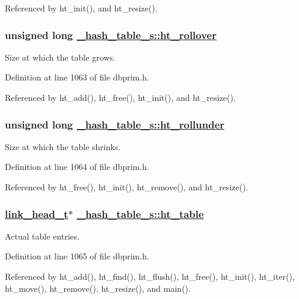 Referenced by ht\_\-init(), and ht\_\-resize().\hypertarget{struct__hash__table__s_o4}{
\subsubsection[ht\_\-rollover]{\setlength{\rightskip}{0pt plus 5cm}unsigned long \hyperlink{struct__hash__table__s_o4}{\_\-hash\_\-table\_\-s::ht\_\-rollover}}}
\label{struct__hash__table__s_o4}


Size at which the table grows. 

Definition at line 1063 of file dbprim.h.

Referenced by ht\_\-add(), ht\_\-free(), ht\_\-init(), and ht\_\-resize().\hypertarget{struct__hash__table__s_o5}{
\subsubsection[ht\_\-rollunder]{\setlength{\rightskip}{0pt plus 5cm}unsigned long \hyperlink{struct__hash__table__s_o5}{\_\-hash\_\-table\_\-s::ht\_\-rollunder}}}
\label{struct__hash__table__s_o5}


Size at which the table shrinks. 

Definition at line 1064 of file dbprim.h.

Referenced by ht\_\-free(), ht\_\-init(), ht\_\-remove(), and ht\_\-resize().\hypertarget{struct__hash__table__s_o6}{
\subsubsection[ht\_\-table]{\setlength{\rightskip}{0pt plus 5cm}\hyperlink{struct__link__head__s}{link\_\-head\_\-t}$\ast$ \hyperlink{struct__hash__table__s_o6}{\_\-hash\_\-table\_\-s::ht\_\-table}}}
\label{struct__hash__table__s_o6}


Actual table entries. 

Definition at line 1065 of file dbprim.h.

Referenced by ht\_\-add(), ht\_\-find(), ht\_\-flush(), ht\_\-free(), ht\_\-init(), ht\_\-iter(), ht\_\-move(), ht\_\-remove(), ht\_\-resize(), and main().